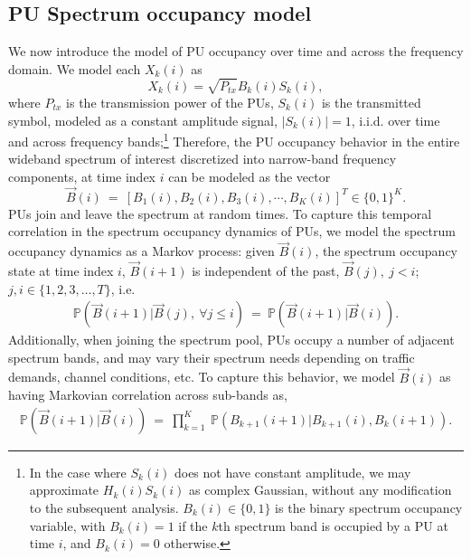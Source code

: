 \documentclass[10pt,twocolumn]{IEEEtran}
\begin{document}
\subsection{PU Spectrum occupancy model}
We now introduce the model of PU occupancy over time and across the frequency domain. We model each $X_k(i)$ as
\begin{equation}\label{4}
    X_k(i)=\sqrt{P_{tx}}B_k(i)S_k(i),
\end{equation}
where $P_{tx}$ is the transmission power of the PUs, $S_k(i)$ is the transmitted symbol, modeled as a 
constant amplitude signal, $|S_k(i)|=1$, i.i.d. over time and across frequency bands;\footnote{In the case where
$S_k(i)$ does not have constant amplitude, we may approximate $H_{k}(i)S_{k}(i)$ as complex Gaussian, without any modification to the subsequent analysis. $B_k(i)\in\{0,1\}$ is the binary spectrum occupancy variable, with $B_k(i)=1$ if the $k$th spectrum band is occupied by a PU at time $i$, and $B_k(i)=0$ otherwise.} Therefore, the PU occupancy behavior in the entire wideband spectrum of interest discretized into narrow-band frequency components, at time index $i$ can be modeled as the vector 
\begin{equation}\label{5}
    \vec{B}(i)\ =\ [B_1(i),B_2(i),B_3(i),\cdots,B_K(i)]^T \in \{0,1\}^K.
\end{equation}
PUs join and leave the spectrum at random times. To capture this temporal correlation in the spectrum occupancy dynamics of PUs,
we model the spectrum occupancy dynamics as a Markov process: given $\vec{B}(i)$, the spectrum occupancy state at time index $i$, $\vec{B}(i+1)$ is independent of the past, $\vec{B}(j),\ j < i$; $j, i \in \{1,2,3,\dots,T\}$, i.e.
\begin{equation}\label{6}
    \begin{aligned}
        \mathbb{P}(\vec{B}(i+1)|\vec{B}(j),\ \forall j \leq i)\ =\ \mathbb{P}(\vec{B}(i+1)|\vec{B}(i)).
    \end{aligned}
\end{equation}
Additionally, when joining the spectrum pool, PUs occupy a number of adjacent spectrum bands, and may vary their spectrum needs depending on traffic demands, channel conditions, etc. To capture this behavior, we model $\vec{B}(i)$ as having Markovian correlation across sub-bands as,
\begin{equation}\label{7}
    \begin{aligned}
         \mathbb{P}(\vec{B}(i+1)|\vec{B}(i))\ =\ 
         \prod_{k=1}^K\ \mathbb{P}(B_{k+1}(i+1)|B_{k+1}(i),B_{k}(i+1)).
    \end{aligned}
\end{equation}
\end{document}
